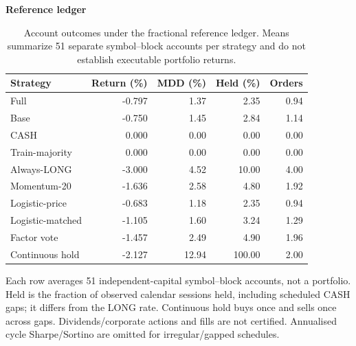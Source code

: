 \begin{table}[!htbp]
\centering\small
\setlength{\tabcolsep}{3pt}
\renewcommand{\arraystretch}{1.15}
\caption{Account outcomes under the fractional reference ledger. Means summarize 51 separate symbol–block accounts per strategy and do not establish executable portfolio returns.}
\label{tab:accounts}
\textbf{Reference ledger}\par\smallskip
\begin{tabular}{lrrrr}
\hline
Strategy & Return (\%) & MDD (\%) & Held (\%) & Orders \\
\hline
Full & -0.797 & 1.37 & 2.35 & 0.94 \\
Base & -0.750 & 1.45 & 2.84 & 1.14 \\
CASH & 0.000 & 0.00 & 0.00 & 0.00 \\
Train-majority & 0.000 & 0.00 & 0.00 & 0.00 \\
Always-LONG & -3.000 & 4.52 & 10.00 & 4.00 \\
Momentum-20 & -1.636 & 2.58 & 4.80 & 1.92 \\
Logistic-price & -0.683 & 1.18 & 2.35 & 0.94 \\
Logistic-matched & -1.105 & 1.60 & 3.24 & 1.29 \\
Factor vote & -1.457 & 2.49 & 4.90 & 1.96 \\
Continuous hold & -2.127 & 12.94 & 100.00 & 2.00 \\
\hline
\end{tabular}\par\medskip
\begin{minipage}{\textwidth}\footnotesize Each row averages 51 independent-capital symbol--block accounts, not a portfolio. Held is the fraction of observed calendar sessions held, including scheduled CASH gaps; it differs from the LONG rate. Continuous hold buys once and sells once across gaps. Dividends/corporate actions and fills are not certified. Annualised cycle Sharpe/Sortino are omitted for irregular/gapped schedules.\end{minipage}
\end{table}
